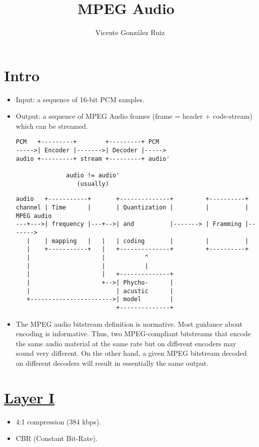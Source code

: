 \title{MPEG Audio~\cite{sayood2017introduction}}
\author{Vicente González Ruiz}
\maketitle
\tableofcontents

\section{Intro}
\begin{itemize}
\item Input: a sequence of 16-bit PCM samples.

\item Output: a sequence of MPEG Audio frames (frame = header +
  code-stream) which can be streamed.

\begin{verbatim}
PCM   +---------+        +---------+ PCM
----->| Encoder |------->| Decoder |----->
audio +---------+ stream +---------+ audio'

              audio != audio'
                 (usually)
\end{verbatim}


\begin{verbatim}
audio   +-----------+       +--------------+         +----------+
channel | Time      |       | Quantization |         |          | MPEG audio
---+--->| frequency |---+-->| and          |-------> | Framming |------->
   |    | mapping   |   |   | coding       |         |          |
   |    +-----------+   |   +--------------+         +----------+
   |                    |           ^
   |                    |           |
   |                    |   +--------------+
   |                    +-->| Phycho-      |
   |                        | acustic      |
   +----------------------->| model        |
                            +--------------+
\end{verbatim}

\item The MPEG audio bitstream definition is normative. Most guidance
  about encoding is informative. Thus, two MPEG-compliant bitstreams
  that encode the same audio material at the same rate but on
  different encoders may sound very different. On the other hand, a
  given MPEG bitstream decoded on different decoders will result in
  essentially the same output.
\end{itemize}

\section{\href{https://en.wikipedia.org/wiki/MPEG-1_Audio_Layer_I}{Layer I}}
\begin{itemize}
\item 4:1 compression (384 kbps).
\item CBR (Constant Bit-Rate).
\end{itemize}

